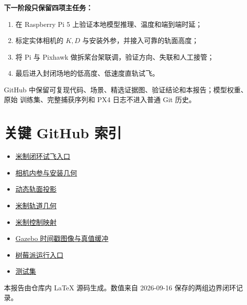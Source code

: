 \documentclass[UTF8,a4paper,11pt,fontset=windows]{ctexart}
\begin{document}
\textbf{下一阶段只保留四项主任务：}
\begin{enumerate}
\item 在 Raspberry Pi 5 上验证本地模型推理、温度和端到端时延；
\item 标定实体相机的 $K,D$ 与安装外参，并接入可靠的轨面高度；
\item 将 Pi 与 Pixhawk 做拆桨台架联调，验证方向、失联和人工接管；
\item 最后进入封闭场地的低高度、低速度直轨试飞。
\end{enumerate}

GitHub 中保留可复现代码、场景、精选证据图、验证结论和本报告；模型权重、原始
训练集、完整捕获序列和 PX4 日志不进入普通 Git 历史。

\clearpage
\section*{关键 GitHub 索引}
\begin{itemize}
\item \href{https://github.com/Yeyu-Tanxue/UAV_control_demo/blob/main/scripts/run_metric_closed_loop.py}
{米制闭环试飞入口}
\item \href{https://github.com/Yeyu-Tanxue/UAV_control_demo/blob/main/src/uav_demo/camera_geometry.py}
{相机内参与安装几何}
\item \href{https://github.com/Yeyu-Tanxue/UAV_control_demo/blob/main/src/uav_demo/ground_projection.py}
{动态轨面投影}
\item \href{https://github.com/Yeyu-Tanxue/UAV_control_demo/blob/main/src/uav_demo/metric_rail_geometry.py}
{米制轨道几何}
\item \href{https://github.com/Yeyu-Tanxue/UAV_control_demo/blob/main/src/uav_demo/metric_control.py}
{米制控制映射}
\item \href{https://github.com/Yeyu-Tanxue/UAV_control_demo/blob/main/src/uav_demo/gazebo_transport.py}
{Gazebo 时间戳图像与真值缓冲}
\item \href{https://github.com/Yeyu-Tanxue/UAV_control_demo/blob/main/scripts/run_rpi_vision_demo.sh}
{树莓派运行入口}
\item \href{https://github.com/Yeyu-Tanxue/UAV_control_demo/tree/main/tests}
{测试集}
\end{itemize}

\vfill
\begin{center}
\small\color{muted}
本报告由仓库内 LaTeX 源码生成。数值来自 2026-09-16 保存的两组边界闭环记录。
\end{center}
\end{document}
